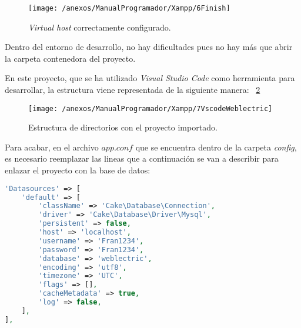 \begin{figure}[h]
	\centering
	\texttt{[image: /anexos/ManualProgramador/Xampp/6Finish]}
	\caption{\textit{Virtual host} correctamente configurado.}
	\label{img:XAMPP_Finish}
\end{figure}

Dentro del entorno de desarrollo, no hay dificultades pues no hay más que abrir la carpeta contenedora del proyecto.

En este proyecto, que se ha utilizado \textit{Visual Studio Code} como herramienta para desarrollar, la estructura viene representada de la siguiente manera: ~\ref{img:VsCodeWeblectric}

\begin{figure}[h]
	\centering
	\texttt{[image: /anexos/ManualProgramador/Xampp/7VscodeWeblectric]}
	\caption{Estructura de directorios con el proyecto importado.}
	\label{img:VsCodeWeblectric}
\end{figure}

\newpage

Para acabar, en el archivo $app.conf$ que se encuentra dentro de la carpeta \textit{config}, es necesario reemplazar las lineas que a continuación se van a describir para enlazar el proyecto con la base de datos:

\begin{lstlisting}[language=php]
'Datasources' => [
	'default' => [
		'className' => 'Cake\Database\Connection',
		'driver' => 'Cake\Database\Driver\Mysql',
		'persistent' => false,
		'host' => 'localhost',
		'username' => 'Fran1234',
		'password' => 'Fran1234',
		'database' => 'weblectric',
		'encoding' => 'utf8',
		'timezone' => 'UTC',
		'flags' => [],
		'cacheMetadata' => true,
		'log' => false,
	],
],
\end{lstlisting}




